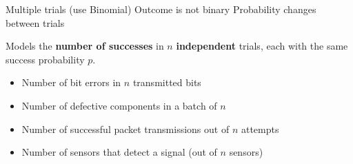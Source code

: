 
\PSno{} Multiple trials (use Binomial)\PSbr{}\PSno{} Outcome is not binary\PSbr{}\PSno{} Probability changes between trials



\begin{Shaded}
\begin{Highlighting}[]
 \OperatorTok{=} \OperatorTok{;}          
 \OperatorTok{=} \OperatorTok{;}
 \OperatorTok{=} \NormalTok{(}\OperatorTok{,} \OperatorTok{,} \OperatorTok{,} \NormalTok{)}\OperatorTok{;}  

\NormalTok{(}\OperatorTok{,} \NormalTok{(}\NormalTok{)}\OperatorTok{,} \NormalTok{)}\OperatorTok{;}
\NormalTok{(}\OperatorTok{,} \NormalTok{(}\NormalTok{)}\OperatorTok{,} \OperatorTok{*}\NormalTok{(}\OperatorTok{{-}}\NormalTok{))}\OperatorTok{;}
\end{Highlighting}
\end{Shaded}



Models the \textbf{number of successes} in $n$ \textbf{independent} trials, each with the same success probability $p$.


\begin{itemize}
\tightlist
\item
  Number of bit errors in $n$ transmitted bits
\item
  Number of defective components in a batch of $n$
\item
  Number of successful packet transmissions out of $n$ attempts
\item
  Number of sensors that detect a signal (out of $n$ sensors)
\end{itemize}

